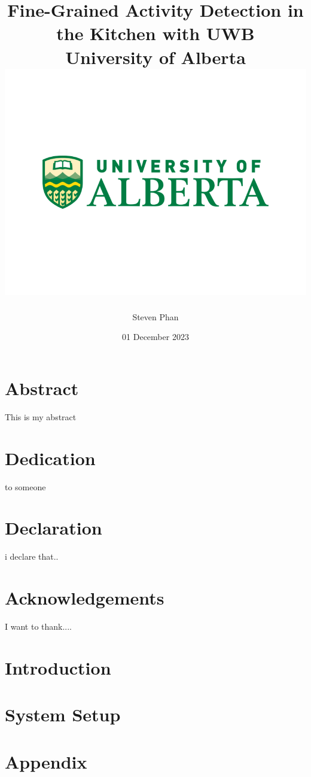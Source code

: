 \documentclass[12pt]{report}
\title{
    {Fine-Grained Activity Detection in the Kitchen with UWB}\\
    {\large University of Alberta}\\
    {\includegraphics[width=\textwidth]{university.png}}
}
\author{Steven Phan}
\date{01 December 2023}
\begin{document}
\maketitle

\chapter*{Abstract}
This is my abstract
\chapter*{Dedication}
to someone
\chapter*{Declaration}
i declare that..
\chapter*{Acknowledgements}
I want to thank....
\tableofcontents

\chapter{Introduction}


\chapter{System Setup}


\appendix
\chapter{Appendix}

\end{document}
